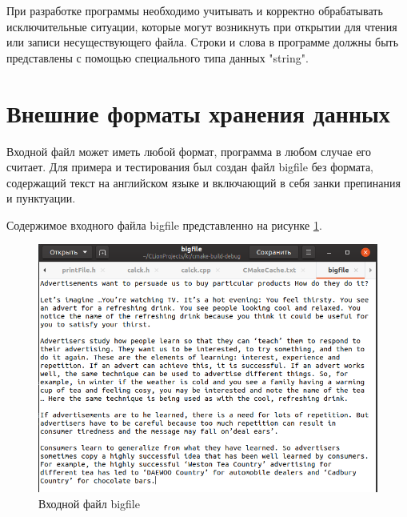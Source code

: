 \documentclass[12pt,a4paper]{article}  %
\begin{document}
При разработке программы необходимо учитывать и корректно
обрабатывать исключительные ситуации, которые могут возникнуть при
открытии для чтения или записи несуществующего файла.
Строки и слова в программе должны быть представлены с помощью
специального типа данных "string".

\newpage

\section{Внешние форматы хранения данных}
\setcounter{figure}{0}

Входной файл может иметь любой формат, программа в любом случае его считает. Для примера и тестирования был создан файл bigfile без формата, содержащий текст на английском языке и включающий в себя занки препинания и пунктуации. 

Содержимое входного файла bigfile представленно на рисунке \ref{in_file}.


\begin{figure}[h!]
		\centering
		\includegraphics[width=0.9\linewidth]{photo/in_file}
		\caption{Входной файл bigfile}
		\label{in_file}
\end{figure}
\newpage
\end{document}

